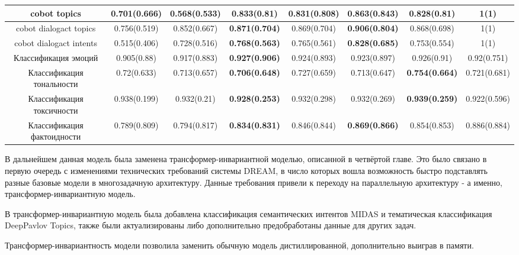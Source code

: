 \begin{table}[htbp]
{\begin{tabular}{|c||c|c|c|c|c|c|c|}
\hline
\hline
cobot topics & \textbf{0.701(0.666)} & 0.568(0.533) & 0.833(0.81) & 0.831(0.808) & \textbf{0.863(0.843)} & 0.828(0.81) & 1(1) \\
\hline
cobot dialogact topics & 0.756(0.519) & 0.852(0.667) & \textbf{0.871(0.704)} & 0.869(0.704) & \textbf{0.906(0.804)} & 0.868(0.698) & 1(1) \\
\hline
cobot dialogact intents & 0.515(0.406) & 0.728(0.516) & \textbf{0.768(0.563)} & 0.765(0.561) & \textbf{0.828(0.685)} & 0.753(0.554) & 1(1) \\
\hline
Классификация эмоций & 0.905(0.88) & 0.917(0.883) & \textbf{0.927(0.906)} & 0.924(0.893) & 0.923(0.897) & 0.926(0.91) & 0.92(0.751) \\
\hline
Классификация тональности & 0.72(0.633) & 0.713(0.657) & \textbf{0.706(0.648)} & 0.727(0.659) & 0.713(0.647) & \textbf{0.754(0.664)} & 0.721(0.681) \\
\hline
Классификация токсичности & 0.938(0.199) & 0.932(0.21) & \textbf{0.928(0.253)} & 0.932(0.298) & 0.932(0.269) & \textbf{0.939(0.259)} & 0.922(0.596) \\
\hline
Классификация фактоидности & 0.789(0.809) & 0.794(0.817) & \textbf{0.834(0.831)} & 0.846(0.844) & \textbf{0.869(0.866)} & 0.854(0.853) & 0.886(0.884) \\
\hline
\end{tabular}
}
\end{table}


В дальнейшем данная модель была заменена трансформер-инвариантной моделью, описанной в четвёртой главе. Это было связано в первую очередь с изменениями технических требований системы DREAM, в число которых вошла возможность быстро подставлять разные базовые модели в многозадачную архитектуру. Данные требования привели к переходу на параллельную архитектуру - а именно, трансформер-инвариантную модель.


В трансформер-инвариантную модель была добавлена классификация семантических интентов MIDAS и тематическая классификация DeepPavlov Topics, также были актуализированы либо дополнительно предобработаны данные для других задач.

Трансформер-инвариантность модели позволила заменить обычную модель дистиллированной, дополнительно выиграв в памяти.

